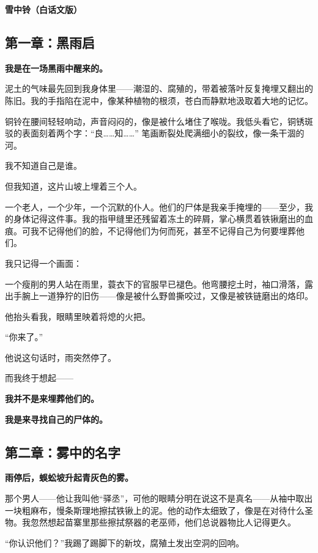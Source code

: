 \documentclass{article}
\begin{document}
	
	\begin{center}
		{\Large{\textbf{\heiti 雪中铃（白话文版）}}}
	\end{center}
	
	\subsection{第一章：黑雨启}
	
	\textbf{我是在一场黑雨中醒来的。}
	
	泥土的气味最先回到我身体里——潮湿的、腐殖的，带着被落叶反复掩埋又翻出的陈旧。我的手指陷在泥中，像某种植物的根须，苍白而静默地汲取着大地的记忆。  
	
	铜铃在腰间轻轻响动，声音闷闷的，像是被什么堵住了喉咙。我低头看它，铜锈斑驳的表面刻着两个字：“良……知……” 笔画断裂处爬满细小的裂纹，像一条干涸的河。  
	
	我不知道自己是谁。  
	
	但我知道，这片山坡上埋着三个人。  
	
	一个老人，一个少年，一个沉默的仆人。他们的尸体是我亲手掩埋的——至少，我的身体记得这件事。我的指甲缝里还残留着冻土的碎屑，掌心横贯着铁锹磨出的血痕。可我不记得他们的脸，不记得他们为何而死，甚至不记得自己为何要埋葬他们。  
	
	我只记得一个画面：
	
	一个瘦削的男人站在雨里，蓑衣下的官服早已褪色。他弯腰挖土时，袖口滑落，露出手腕上一道狰狞的旧伤——像是被什么野兽撕咬过，又像是被铁链磨出的烙印。  
	
	他抬头看我，眼睛里映着将熄的火把。  
	
	“你来了。”
	
	他说这句话时，雨突然停了。  
	
	而我终于想起——  
	
	\textbf{我并不是来埋葬他们的。 }
	
	\textbf{我是来寻找自己的尸体的。} 
	
	\subsection{第二章：雾中的名字}
	
	\textbf{雨停后，蜈蚣坡升起青灰色的雾。}  
	
	那个男人——他让我叫他“驿丞”，可他的眼睛分明在说这不是真名——从袖中取出一块粗麻布，慢条斯理地擦拭铁锹上的泥。他的动作太细致了，像是在对待什么圣物。我忽然想起苗寨里那些擦拭祭器的老巫师，他们总说器物比人记得更久。  
	
	“你认识他们？”我踢了踢脚下的新坟，腐殖土发出空洞的回响。  
	
\end{document}
